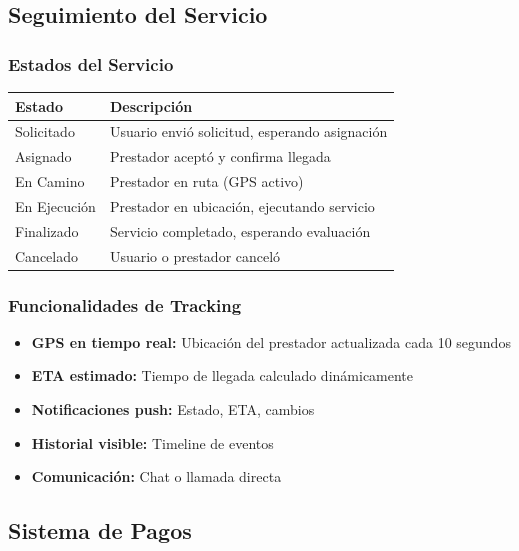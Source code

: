 \documentclass[12pt,a4paper,spanish]{article}
\begin{document}
\subsection{Seguimiento del Servicio}

\subsubsection{Estados del Servicio}

\begin{center}
\begin{tabular}{|l|p{5cm}|}
    \toprule
    \textbf{Estado} & \textbf{Descripción} \\
    \midrule
    Solicitado & Usuario envió solicitud, esperando asignación \\
    Asignado & Prestador aceptó y confirma llegada \\
    En Camino & Prestador en ruta (GPS activo) \\
    En Ejecución & Prestador en ubicación, ejecutando servicio \\
    Finalizado & Servicio completado, esperando evaluación \\
    Cancelado & Usuario o prestador canceló \\
    \bottomrule
\end{tabular}
\end{center}

\subsubsection{Funcionalidades de Tracking}

\begin{itemize}
    \item \textbf{GPS en tiempo real:} Ubicación del prestador actualizada cada 10 segundos
    \item \textbf{ETA estimado:} Tiempo de llegada calculado dinámicamente
    \item \textbf{Notificaciones push:} Estado, ETA, cambios
    \item \textbf{Historial visible:} Timeline de eventos
    \item \textbf{Comunicación:} Chat o llamada directa
\end{itemize}

\subsection{Sistema de Pagos}
\end{document}
